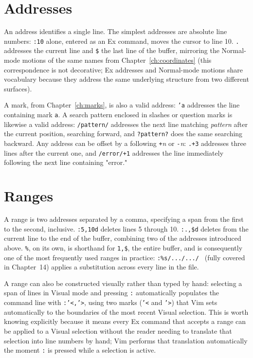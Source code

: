 \section{Addresses}

An address identifies a single line. The simplest addresses are absolute line numbers: \texttt{:10} alone, entered as an Ex command, moves the cursor to line 10. \texttt{.} addresses the current line and \texttt{\$} the last line of the buffer, mirroring the Normal-mode motions of the same names from Chapter~\ref{ch:coordinates} (this correspondence is not decorative; Ex addresses and Normal-mode motions share vocabulary because they address the same underlying structure from two different surfaces).

A mark, from Chapter~\ref{ch:marks}, is also a valid address: \texttt{'a} addresses the line containing mark \texttt{a}. A search pattern enclosed in slashes or question marks is likewise a valid address: \texttt{/pattern/} addresses the next line matching \textit{pattern} after the current position, searching forward, and \texttt{?pattern?} does the same searching backward. Any address can be offset by a following \texttt{+}\textit{n} or \texttt{-}\textit{n}: \texttt{.+3} addresses three lines after the current one, and \texttt{/error/+1} addresses the line immediately following the next line containing "error."

\section{Ranges}

A range is two addresses separated by a comma, specifying a span from the first to the second, inclusive. \texttt{:5,10d} deletes lines 5 through 10. \texttt{:.,\$d} deletes from the current line to the end of the buffer, combining two of the addresses introduced above. \texttt{\%}, on its own, is shorthand for \texttt{1,\$}, the entire buffer, and is consequently one of the most frequently used ranges in practice: \texttt{:\%s/.../.../ } (fully covered in Chapter~14) applies a substitution across every line in the file.

A range can also be constructed visually rather than typed by hand: selecting a span of lines in Visual mode and pressing \texttt{:} automatically populates the command line with \texttt{:'<,'>}, using two marks (\texttt{'<} and \texttt{'>}) that Vim sets automatically to the boundaries of the most recent Visual selection. This is worth knowing explicitly because it means every Ex command that accepts a range can be applied to a Visual selection without the reader needing to translate that selection into line numbers by hand; Vim performs that translation automatically the moment \texttt{:} is pressed while a selection is active.

